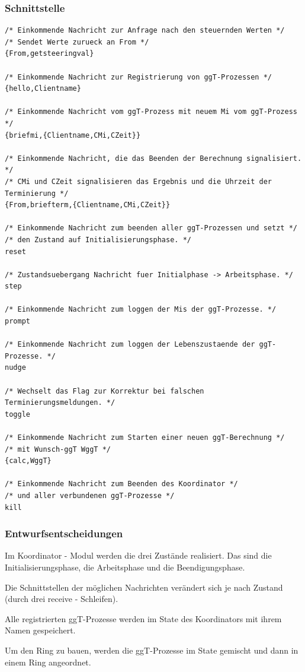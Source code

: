 \documentclass{article}
\begin{document}
\subsubsection{Schnittstelle}
\begin{lstlisting}
/* Einkommende Nachricht zur Anfrage nach den steuernden Werten */
/* Sendet Werte zurueck an From */
{From,getsteeringval}

/* Einkommende Nachricht zur Registrierung von ggT-Prozessen */
{hello,Clientname}

/* Einkommende Nachricht vom ggT-Prozess mit neuem Mi vom ggT-Prozess */
{briefmi,{Clientname,CMi,CZeit}}

/* Einkommende Nachricht, die das Beenden der Berechnung signalisiert. */
/* CMi und CZeit signalisieren das Ergebnis und die Uhrzeit der Terminierung */
{From,briefterm,{Clientname,CMi,CZeit}}

/* Einkommende Nachricht zum beenden aller ggT-Prozessen und setzt */
/* den Zustand auf Initialisierungsphase. */
reset

/* Zustandsuebergang Nachricht fuer Initialphase -> Arbeitsphase. */
step

/* Einkommende Nachricht zum loggen der Mis der ggT-Prozesse. */
prompt

/* Einkommende Nachricht zum loggen der Lebenszustaende der ggT-Prozesse. */
nudge

/* Wechselt das Flag zur Korrektur bei falschen Terminierungsmeldungen. */
toggle

/* Einkommende Nachricht zum Starten einer neuen ggT-Berechnung */
/* mit Wunsch-ggT WggT */
{calc,WggT}

/* Einkommende Nachricht zum Beenden des Koordinator */
/* und aller verbundenen ggT-Prozesse */
kill
\end{lstlisting}

\subsubsection{Entwurfsentscheidungen}
Im Koordinator - Modul werden die drei Zustände realisiert. Das sind die Initialisierungsphase, die Arbeitsphase und
die Beendigungsphase.

Die Schnittstellen der möglichen Nachrichten verändert sich je nach Zustand (durch drei receive - Schleifen).

Alle registrierten ggT-Prozesse werden im State des Koordinators mit ihrem Namen gespeichert.

Um den Ring zu bauen, werden die ggT-Prozesse im State gemischt und dann in einem Ring angeordnet.
\end{document}
